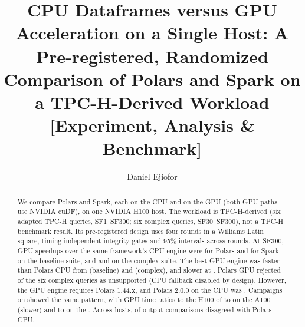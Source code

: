 \documentclass[sigconf, nonacm]{acmart}
\begin{document}
\title[CPU Dataframes versus GPU Acceleration on a Single Host]{CPU Dataframes
  versus GPU Acceleration on a Single Host: A Pre-registered, Randomized
  Comparison of Polars and Spark on a TPC-H-Derived
  Workload\laddertitlesuffix{} [Experiment, Analysis \& Benchmark]}

\author{Daniel Ejiofor}

\begin{abstract}
We compare Polars and Spark, each on the CPU and on the GPU (both GPU paths
use NVIDIA cuDF), on one NVIDIA H100 host. The workload is TPC-H-derived (six
adapted TPC-H queries, SF1--SF300; six complex queries, SF30--SF300), not a
TPC-H benchmark result. Its pre-registered design uses four rounds in a
Williams Latin square, timing-independent integrity gates and 95\% intervals
across rounds. At SF300, GPU speedups over the same framework's CPU engine were
 for Polars and  for
Spark on the baseline suite, and  and
 on the complex suite. The best GPU engine was
faster than Polars CPU from  (baseline) and
 (complex), and slower at
. Polars GPU rejected
 of the six complex queries as
unsupported (CPU fallback disabled by design). However, the GPU engine requires
Polars 1.44.x, and Polars 2.0.0 on the CPU was .
\ifladderran
Campaigns on  showed the same pattern, with GPU
time ratios to the H100 of
\ifaonehundredran
{} to  on the
A100 (slower) and
\fi
 to  on the
.
\fi
Across  hosts,  of
 output comparisons disagreed with Polars CPU.
\end{abstract}

\maketitle

\vldbtopmatter
\end{document}
